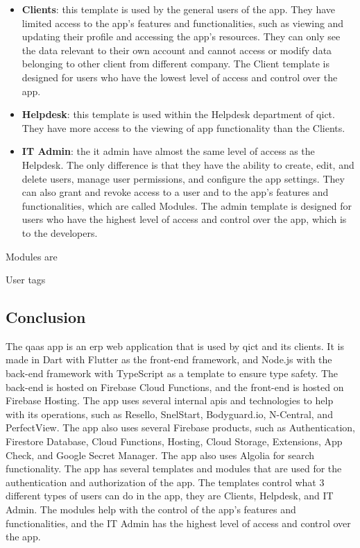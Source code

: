 \begin{multicols}{2}
      \begin{itemize}
            \item \textbf{Clients}: this template is used by the general users of the app. They have limited access to
                  the app's features and functionalities, such as viewing and updating their profile and accessing the app's
                  resources. They can only see the data relevant to their own account and cannot access or modify data
                  belonging to other client from different company.  The Client template is designed for users who have the
                  lowest level of access and control over the app.
            \item \textbf{Helpdesk}: this template is used within the Helpdesk department of \acrshort{qict}. They have more
                  access to the viewing of app functionality than the Clients.
            \item \textbf{IT Admin}: the \acrshort{it} admin have almost the same level of access as the Helpdesk. The only
                  difference is that they have the ability to create, edit, and delete users, manage user permissions, and
                  configure the app settings. They can also grant and revoke access to a user and to the app's features and
                  functionalities, which are called Modules. The admin template is designed for users who have the highest level
                  of access and control over the app, which is to the developers.
      \end{itemize}

      Modules are

      User tags

      \subsection{Conclusion}
      The \acrshort{qaas} app is an \acrshort{erp} web application that is used by \acrshort{qict} and its clients.
      It is made in Dart with Flutter as the front-end framework, and Node.js with the back-end  framework with
      TypeScript as a template to ensure type safety. The back-end is hosted on Firebase Cloud Functions, and the
      front-end is hosted on Firebase Hosting. The app uses several internal \acrshort{api}s and technologies to
      help with its operations, such as Resello, SnelStart, Bodyguard.io, N-Central, and PerfectView. The app also
      uses several Firebase products, such as Authentication, Firestore Database, Cloud Functions, Hosting, Cloud
      Storage, Extensions, App Check, and Google Secret Manager. The app also uses Algolia for search functionality. The app
      has several templates and modules that are used for the authentication and authorization of the app.
      The templates control what 3 different types of users can do in the app, they are Clients, Helpdesk, and IT
      Admin. The modules help with the control of the app's features and functionalities, and the IT Admin has the
      highest level of access and control over the app.


\end{multicols}
